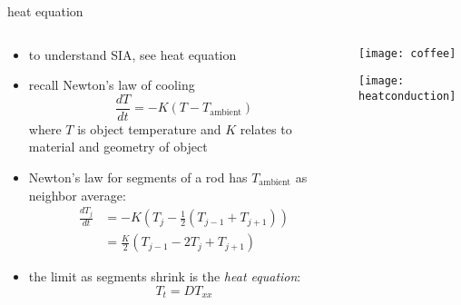 \begin{frame}{heat equation}
\label{slide:heatcompare}

\small
\begin{columns}
\begin{column}{0.7\textwidth}
\begin{itemize}
\item to understand SIA, see heat equation
\item recall Newton's law of cooling
	$$\frac{dT}{dt} = -K (T-T_{\text{ambient}})$$
where $T$ is object temperature and $K$ relates to material and geometry of object
\item Newton's law for segments of a rod has $T_{\text{ambient}}$ as neighbor average:
\begin{align*}
\frac{dT_j}{dt} &= -K \left(T_j - \frac{1}{2} (T_{j-1} + T_{j+1}) \right) \\
	&= \frac{K}{2} \left(T_{j-1} - 2 T_j + T_{j+1}\right) 
\end{align*}
\item the limit as segments shrink is the \emph{heat equation}:
	$$T_t = D T_{xx}$$
\end{itemize}
\end{column}

\begin{column}{0.3\textwidth}
\hfill \texttt{[image: coffee]}

\vspace{0.4in}
\texttt{[image: heatconduction]}
\end{column}
\end{columns}
\end{frame}

